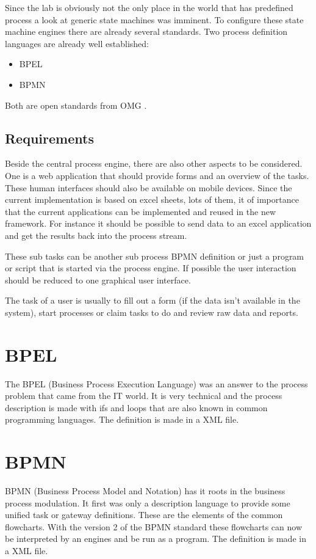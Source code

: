\documentclass[paper=a4,twoside=false,BCOR=0mm,DIV=calc,fontsize=12pt]{scrartcl}
\begin{document}
Since the lab is obviously not the only place in the world that has predefined process a look at generic state machines was imminent.
To configure these state  machine engines there are already several standards. Two process definition languages are already well established:

\begin{itemize}
 \item BPEL
 \item BPMN
\end{itemize}

Both are open standards from OMG \cite{omg}.



\subsection{Requirements}
Beside the central process engine, there are also other aspects to be considered. One is a web application that should provide forms and an overview
of the tasks. These human interfaces should also be available on mobile devices.
Since the current implementation is based on excel sheets, lots of them, it of importance that the current applications can be implemented and reused in the new framework.
For instance it should be possible to send data to an excel application and get the results back into the process stream.

These sub tasks can be another sub process BPMN definition or just a program or script that is started via the process engine. If possible the user interaction should be reduced to one graphical user interface. 

The task of a user is usually to fill out a form (if the data isn't available in the system), start processes or claim tasks to do and review raw data and reports.

\section{BPEL}
The BPEL (Business Process Execution Language) \cite{bpel} was an answer to the process problem that came from the IT world. It is very technical and the process description is made with ifs and loops that are also known in common programming languages. The definition is made in a XML file. 

\section{BPMN}
BPMN (Business Process Model and Notation) \cite{bpmn} has it roots in the business process modulation. It first was only a description language to provide some unified task or gateway definitions. These are the elements of the common flowcharts. 
With the version 2 of the BPMN standard these flowcharts can now be interpreted by an engines and be run as a program.
The definition is made in a XML file. 
\end{document}
